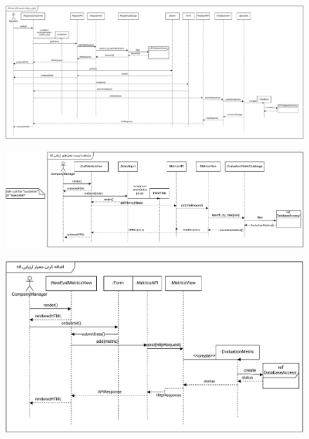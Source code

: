 \eject \pdfpagewidth=17in \pdfpageheight=8in


\begin{figure}[ht!]
	\centering
	\includegraphics[scale=0.8]{figs/design-sequence/3-25.pdf}
\end{figure}
\FloatBarrier
\newpage

\eject \pdfpagewidth=13in \pdfpageheight=6in


\begin{figure}[ht!]
	\centering
	\includegraphics[scale=0.8]{figs/design-sequence/3-26.pdf}
\end{figure}
\FloatBarrier
\newpage

\eject \pdfpagewidth=10in \pdfpageheight=8in

\begin{figure}[ht!]
	\centering
	\includegraphics[scale=0.8]{figs/design-sequence/3-27.pdf}
\end{figure}
\FloatBarrier
\newpage

